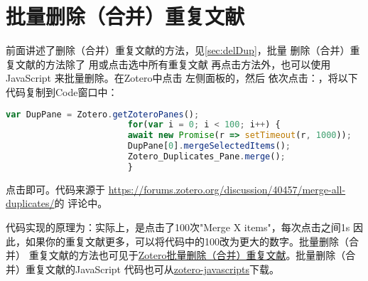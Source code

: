 \documentclass[cn,11pt,chinese]{elegantbook}
\begin{document}
		\section{批量删除（合并）重复文献}\label{sec:DelDupBatch}				
			 	前面讲述了删除（合并）重复文献的方法，见\cref{sec:delDup}，批量
				 删除（合并）重复文献的方法除了
				 用或点击选中所有重复文献
				 再点击方法外，也可以使用JavaScript
				 来批量删除。在Zotero中点击
				 左侧面板的，然后
				 依次点击：，将以下代码复制到Code窗口中：

					\begin{lstlisting}[language=JavaScript]
						var DupPane = Zotero.getZoteroPanes();
						for(var i = 0; i < 100; i++) {
						await new Promise(r => setTimeout(r, 1000));
						DupPane[0].mergeSelectedItems();
						Zotero_Duplicates_Pane.merge();
						}
					\end{lstlisting}
				点击即可。代码来源于
				\url{https://forums.zotero.org/discussion/40457/merge-all-duplicates/}的
				评论中。

				代码实现的原理为：实际上，是点击了100次"Merge X items"，每次点击之间1s
				因此，如果你的重复文献更多，可以将代码中的100改为更大的数字。批量删除（合并）
				重复文献的方法也可见于\href{https://zhuanlan.zhihu.com/p/352324486}
				{Zotero批量删除（合并）重复文献}。批量删除（合并）重复文献的JavaScript
				代码也可从\href{https://github.com/redleafnew/zotero-javascripts}
				{zotero-javascripts}下载。
\end{document}
